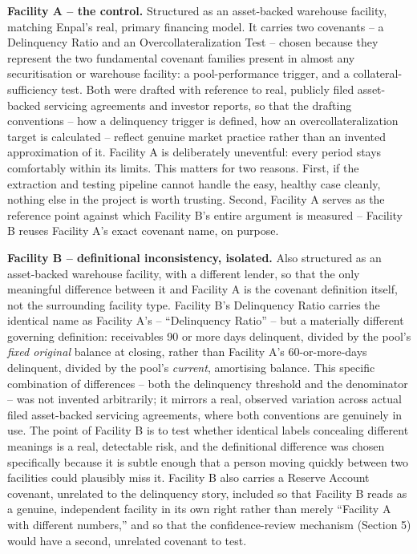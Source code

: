 \documentclass[11pt,a4paper]{article}
\begin{document}
\textbf{Facility A -- the control.} Structured as an asset-backed warehouse facility, matching Enpal's real, primary financing model. It carries two covenants -- a Delinquency Ratio and an Overcollateralization Test -- chosen because they represent the two fundamental covenant families present in almost any securitisation or warehouse facility: a pool-performance trigger, and a collateral-sufficiency test. Both were drafted with reference to real, publicly filed asset-backed servicing agreements and investor reports, so that the drafting conventions -- how a delinquency trigger is defined, how an overcollateralization target is calculated -- reflect genuine market practice rather than an invented approximation of it. Facility A is deliberately uneventful: every period stays comfortably within its limits. This matters for two reasons. First, if the extraction and testing pipeline cannot handle the easy, healthy case cleanly, nothing else in the project is worth trusting. Second, Facility A serves as the reference point against which Facility B's entire argument is measured -- Facility B reuses Facility A's exact covenant name, on purpose.

\textbf{Facility B -- definitional inconsistency, isolated.} Also structured as an asset-backed warehouse facility, with a different lender, so that the only meaningful difference between it and Facility A is the covenant definition itself, not the surrounding facility type. Facility B's Delinquency Ratio carries the identical name as Facility A's -- ``Delinquency Ratio'' -- but a materially different governing definition: receivables 90 or more days delinquent, divided by the pool's \emph{fixed original} balance at closing, rather than Facility A's 60-or-more-days delinquent, divided by the pool's \emph{current}, amortising balance. This specific combination of differences -- both the delinquency threshold and the denominator -- was not invented arbitrarily; it mirrors a real, observed variation across actual filed asset-backed servicing agreements, where both conventions are genuinely in use. The point of Facility B is to test whether identical labels concealing different meanings is a real, detectable risk, and the definitional difference was chosen specifically because it is subtle enough that a person moving quickly between two facilities could plausibly miss it. Facility B also carries a Reserve Account covenant, unrelated to the delinquency story, included so that Facility B reads as a genuine, independent facility in its own right rather than merely ``Facility A with different numbers,'' and so that the confidence-review mechanism (Section 5) would have a second, unrelated covenant to test.
\end{document}
